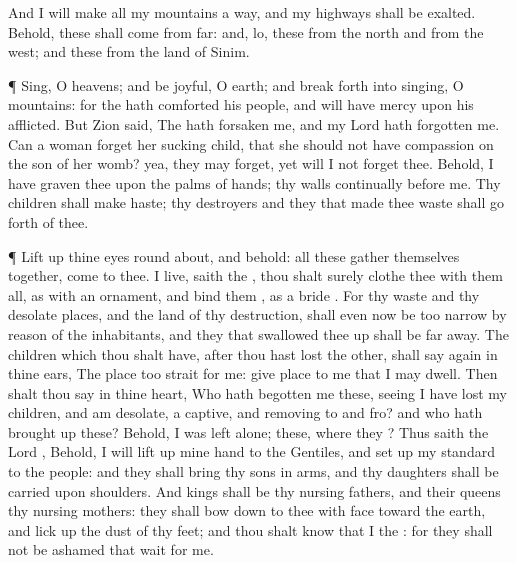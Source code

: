 {And I will
make all my
mountains a
way, and my
highways shall be
exalted.
Behold, these shall
come from
far: and, lo, these from the
north and from the
west; and these from the
land of
Sinim.
\par }{\PP {}¶
Sing, O
heavens; and be
joyful, O
earth; and break
forth into
singing, O
mountains: for the
{} hath
comforted his
people, and will have
mercy upon his
afflicted.
But
Zion
said, The
{} hath
forsaken me, and my
Lord hath
forgotten me.
Can a
woman
forget her sucking
child, that she should not have
compassion on the
son of her
womb? yea, they may
forget, yet will I not
forget thee.
Behold, I have
graven thee upon the palms of
{}
hands; thy
walls
{}
continually before me.
Thy
children shall make
haste; thy
destroyers and they that made thee
waste shall go
forth of thee.
\par }{\PP {}¶ Lift
up thine
eyes round
about, and
behold: all these gather themselves
together,
{}
come to thee.
{} I
live,
saith the
{}, thou shalt surely
clothe thee with them all, as with an
ornament, and
bind them
{}, as a
bride
{}.
For thy
waste and thy desolate
places, and the
land of thy
destruction, shall even now be too
narrow by reason of the
inhabitants, and they that swallowed thee
up shall be far
away.
The
children which thou shalt have, after thou hast
lost the other, shall
say again in thine
ears, The
place
{} too
strait for me:
give
place to me that I may
dwell.
Then shalt thou
say in thine
heart, Who hath
begotten me these, seeing I have lost my
children, and am
desolate, a
captive, and removing to and
fro? and who hath brought
up these? Behold, I was
left alone; these,
where
{} they
{}?
Thus
saith the
Lord
{}, Behold, I will lift
up mine
hand to the
Gentiles, and set
up my
standard to the
people: and they shall
bring thy
sons in
{}
arms, and thy
daughters shall be
carried upon
{}
shoulders.
And
kings shall be thy nursing
fathers, and their
queens thy nursing
mothers: they shall bow
down to thee with
{}
face toward the
earth, and lick
up the
dust of thy
feet; and thou shalt
know that I
{} the
{}: for they shall not be
ashamed that
wait for me.
}
